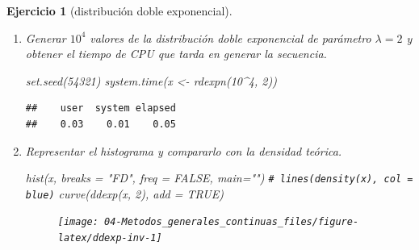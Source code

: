 \documentclass[
]{book}
\newenvironment{Shaded}{\begin{snugshade}}{\end{snugshade}}
\newcommand{\AttributeTok}[1]{\textcolor[rgb]{0.77,0.63,0.00}{#1}}
\newcommand{\CommentTok}[1]{\textcolor[rgb]{0.56,0.35,0.01}{\textit{#1}}}
\newcommand{\ConstantTok}[1]{\textcolor[rgb]{0.00,0.00,0.00}{#1}}
\newcommand{\ControlFlowTok}[1]{\textcolor[rgb]{0.13,0.29,0.53}{\textbf{#1}}}
\newcommand{\DecValTok}[1]{\textcolor[rgb]{0.00,0.00,0.81}{#1}}
\newcommand{\FunctionTok}[1]{\textcolor[rgb]{0.00,0.00,0.00}{#1}}
\newcommand{\NormalTok}[1]{#1}
\newcommand{\OtherTok}[1]{\textcolor[rgb]{0.56,0.35,0.01}{#1}}
\newcommand{\SpecialCharTok}[1]{\textcolor[rgb]{0.00,0.00,0.00}{#1}}
\newcommand{\StringTok}[1]{\textcolor[rgb]{0.31,0.60,0.02}{#1}}
\theoremstyle{break}
\newtheorem{exercise}{Ejercicio}[chapter]
\theoremstyle{nonumberplain}
\renewcommand{\CommentTok}[1]{\textcolor[rgb]{0.41,0.41,0.41}{\texttt{#1}}}
\begin{document}
\begin{exercise}[distribución doble exponencial]
\begin{enumerate}
\begin{Shaded}
\begin{Highlighting}[]
\NormalTok{rdexpn }\OtherTok{\textless{}{-}} \ControlFlowTok{function}\NormalTok{(}\AttributeTok{n =} \DecValTok{1000}\NormalTok{, }\AttributeTok{lambda =} \DecValTok{1}\NormalTok{) \{}
\CommentTok{\# Simulación n valores de doble exponencial}
\NormalTok{    x }\OtherTok{\textless{}{-}} \FunctionTok{numeric}\NormalTok{(n)}
    \ControlFlowTok{for}\NormalTok{(i }\ControlFlowTok{in} \DecValTok{1}\SpecialCharTok{:}\NormalTok{n) x[i]}\OtherTok{\textless{}{-}}\FunctionTok{rdexp}\NormalTok{(lambda)}
    \FunctionTok{return}\NormalTok{(x)}
\NormalTok{\}}
\end{Highlighting}
\end{Shaded}
\item
  Generar \(10^{4}\) valores de la distribución doble exponencial de
  parámetro \(\lambda=2\) y obtener el tiempo de CPU que tarda en
  generar la secuencia.

\begin{Shaded}
\begin{Highlighting}[]
\FunctionTok{set.seed}\NormalTok{(}\DecValTok{54321}\NormalTok{)}
\FunctionTok{system.time}\NormalTok{(x }\OtherTok{\textless{}{-}} \FunctionTok{rdexpn}\NormalTok{(}\DecValTok{10}\SpecialCharTok{\^{}}\DecValTok{4}\NormalTok{, }\DecValTok{2}\NormalTok{))}
\end{Highlighting}
\end{Shaded}

\begin{verbatim}
##    user  system elapsed 
##    0.03    0.01    0.05
\end{verbatim}
\item
  Representar el histograma y compararlo con la densidad teórica.

\begin{Shaded}
\begin{Highlighting}[]
\FunctionTok{hist}\NormalTok{(x, }\AttributeTok{breaks =} \StringTok{"FD"}\NormalTok{, }\AttributeTok{freq =} \ConstantTok{FALSE}\NormalTok{, }\AttributeTok{main=}\StringTok{""}\NormalTok{)}
\CommentTok{\# lines(density(x), col = \textquotesingle{}blue\textquotesingle{})}
\FunctionTok{curve}\NormalTok{(}\FunctionTok{ddexp}\NormalTok{(x, }\DecValTok{2}\NormalTok{), }\AttributeTok{add =} \ConstantTok{TRUE}\NormalTok{)}
\end{Highlighting}
\end{Shaded}

  \begin{figure}[!htb]

  {\centering \texttt{[image: 04-Metodos\_generales\_continuas\_files/figure-latex/ddexp-inv-1]} 

}
\end{figure}
\end{enumerate}
\end{exercise}
\end{document}
